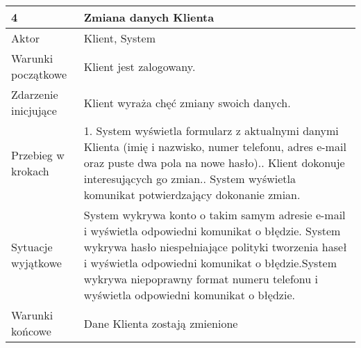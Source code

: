 \par
\begin{tabularx}{\textwidth}{|l|X|}
\hline
4                      & Zmiana danych Klienta                                                                                                                                                                                                                                                                                                                             \\ \hline
Aktor                  & Klient, System \\ \hline
Warunki początkowe     & Klient jest zalogowany.                                                                                                                                                                                                                                                                                                                           \\ \hline
Zdarzenie inicjujące   & Klient wyraża chęć zmiany swoich danych.                                                                                                                                                                                                                                                                                                          \\ \hline
Przebieg w krokach     & 1. System wyświetla formularz z aktualnymi danymi Klienta (imię i nazwisko, numer telefonu, adres e-mail oraz puste dwa pola na nowe hasło).\newline 2. Klient dokonuje interesujących go zmian.\newline 3. System wyświetla komunikat potwierdzający dokonanie zmian.                                                \\ \hline
Sytuacje wyjątkowe     & System wykrywa konto o takim samym adresie e-mail i wyświetla odpowiedni komunikat o błędzie. \newline System wykrywa hasło niespełniające polityki tworzenia haseł i wyświetla odpowiedni komunikat o błędzie.\newline System wykrywa niepoprawny format numeru telefonu i wyświetla odpowiedni komunikat o błędzie. \\ \hline
Warunki końcowe        & Dane Klienta zostają zmienione                                                                                                                                                                                                                                                                                                                    \\ \hline
\end{tabularx}
